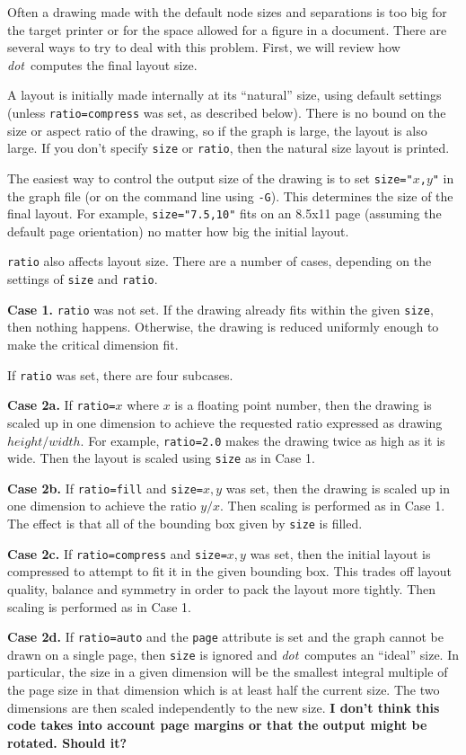 \documentclass[11pt]{article}
\def\dot{{\it dot}}
\begin{document}
Often a drawing made with the default node sizes and separations
is too big for the target printer or for the space allowed for
a figure in a document.  There are several ways to try to deal with
this problem.   First, we will review how \dot\ computes the 
final layout size.

A layout is initially made internally at its ``natural'' size,
using default settings (unless {\tt ratio=compress} was set,
as described below). There is no
bound on the size or aspect ratio of the drawing, so if the graph
is large, the layout is also large.  If you don't specify {\tt size}
or {\tt ratio}, then the natural size layout is printed.

The easiest way to control the output size of the drawing is to
set {\tt size="$x$,$y$"} in the graph file (or on the command line
using \verb"-G").
This determines the size of the final layout.
For example, \verb'size="7.5,10"' fits on an 8.5x11 page
(assuming the default page orientation)
no matter how big the initial layout.

\verb"ratio" also affects layout size.
There are a number of cases, depending on the settings of {\tt size}
and {\tt ratio}.

{\bf Case 1.} \verb"ratio" was not set.  
If the drawing already fits within the given \verb"size", then nothing happens.
Otherwise, the drawing is reduced uniformly enough to make the critical
dimension fit.

If \verb"ratio" was set, there are four subcases.

{\bf Case 2a.} If \verb"ratio="$x$ where $x$ is a floating point number,
then the drawing is scaled up in one dimension to achieve the requested
ratio expressed as drawing $height/width$.
For example, \verb"ratio=2.0" makes the drawing twice as high
as it is wide. Then the layout is scaled using \verb"size" as in Case 1.

{\bf Case 2b.} If \verb"ratio=fill" and \verb"size="$x,y$ was set,
then the drawing is scaled up in one dimension to achieve the ratio
$y/x$.
Then scaling is performed as in Case 1.
The effect is that all of the bounding box given by \verb"size" is filled.

{\bf Case 2c.} If \verb"ratio=compress"
and \verb"size="$x,y$ was set, then the initial layout is compressed
to attempt to fit it in the given bounding box.  This trades off
layout quality, balance and symmetry in order to pack the layout more tightly.
Then scaling is performed as in Case 1.

{\bf Case 2d.} If \verb"ratio=auto" and the {\tt page} attribute is
set and the graph cannot be drawn on a single page, 
then \verb"size" is ignored and \dot\ computes an ``ideal'' size.
In particular, the size in a given dimension will be the smallest integral 
multiple of the page size in that dimension which is at least half
the current size.
The two dimensions are then scaled independently to the new size.
{\bf I don't think this code takes into account page margins or that
the output might be rotated. Should it?}
\fi
\end{document}
